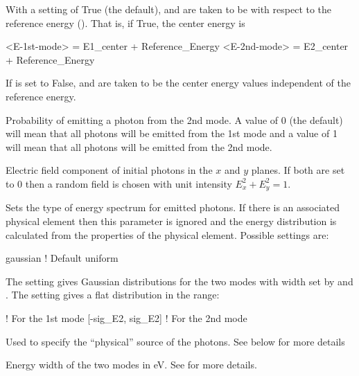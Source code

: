 {\begin{description}
  \item[\vn{E_center_relative_to_ref}] \Newline
With a setting of True (the default),  and  are taken to be with respect
to the reference energy (). That is, if True, the center energy  is
\begin{example}
  <E-1st-mode> = E1_center + Reference_Energy
  <E-2nd-mode> = E2_center + Reference_Energy
\end{example}
If  is set to False,  and  are taken to be
the center energy values independent of the reference energy.

  \item[\vn{E2_probability}] \Newline
Probability of emitting a photon from the 2nd mode. A value of 0 (the default) will mean
that all photons will be emitted from the 1st mode and a value of 1 will mean that
all photons will be emitted from the 2nd mode.

  \item[\vn{e_field_x}, \vn{e_field_y}] \Newline
Electric field component of initial photons in the $x$ and $y$ planes.
If both are set to 0 then a random field is chosen with unit intensity
$E_x^2 + E_y^2 = 1$.

  \item[\vn{energy_distribution}] \Newline
Sets the type of energy spectrum for emitted photons. If there is an associated physical element
then this parameter is ignored and the energy distribution is calculated from the properties of the
physical element. Possible settings are:
\begin{example}
  gaussian   ! Default
  uniform
\end{example}
The  setting gives Gaussian distributions for the two modes with width
set by  and . The  setting gives a flat
distribution in the range:
\begin{example}
      ! For the 1st mode
  [-sig_E2, sig_E2]  ! For the 2nd mode
\end{example}

  \item[\vn{physical_source}] \Newline
Used to specify the ``physical'' source of the photons. See below for more details

  \item[\vn{sig_E}, \vn{sig_E2}] \Newline
Energy width of the two modes in eV. See  for more
details.


\end{description}}

